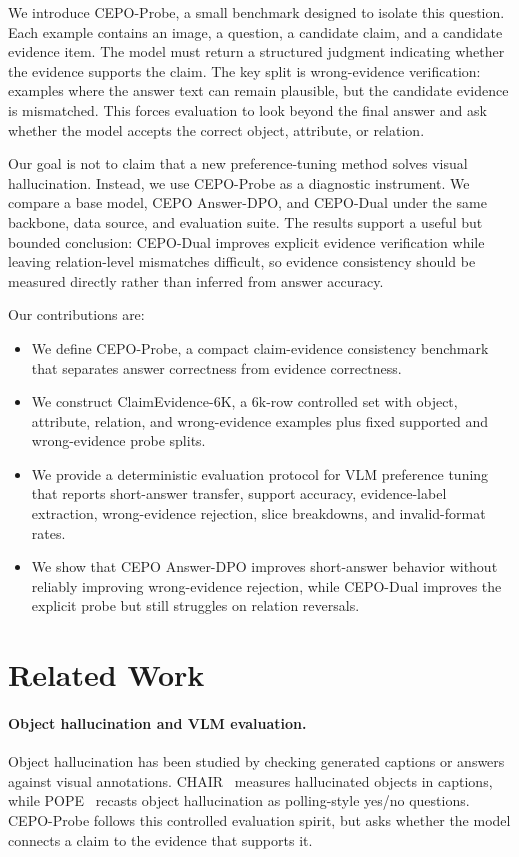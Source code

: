 \documentclass[10pt,twocolumn,letterpaper]{article}
\newcommand{\benchmark}{CEPO-Probe}
\newcommand{\dataset}{ClaimEvidence-6K}
\newcommand{\answerdpo}{CEPO Answer-DPO}
\newcommand{\cepodual}{CEPO-Dual}
\begin{document}
We introduce \benchmark{}, a small benchmark designed to isolate this question.
Each example contains an image, a question, a candidate claim, and a candidate
evidence item. The model must return a structured judgment indicating whether
the evidence supports the claim. The key split is wrong-evidence verification:
examples where the answer text can remain plausible, but the candidate
evidence is mismatched. This forces evaluation to look beyond the final answer
and ask whether the model accepts the correct object, attribute, or relation.

Our goal is not to claim that a new preference-tuning method solves visual
hallucination. Instead, we use \benchmark{} as a diagnostic instrument. We
compare a base model, \answerdpo{}, and \cepodual{} under the same backbone,
data source, and evaluation suite. The results support a useful but bounded
conclusion: \cepodual{} improves explicit evidence verification while leaving
relation-level mismatches difficult, so evidence consistency should be measured
directly rather than inferred from answer accuracy.

Our contributions are:
\begin{itemize}
    \item We define \benchmark{}, a compact claim-evidence consistency
    benchmark that separates answer correctness from evidence correctness.
    \item We construct \dataset{}, a 6k-row controlled set with object,
    attribute, relation, and wrong-evidence examples plus fixed supported and
    wrong-evidence probe splits.
    \item We provide a deterministic evaluation protocol for VLM preference
    tuning that reports short-answer transfer, support accuracy,
    evidence-label extraction, wrong-evidence rejection, slice breakdowns, and
    invalid-format rates.
    \item We show that \answerdpo{} improves short-answer behavior without
    reliably improving wrong-evidence rejection, while \cepodual{} improves the
    explicit probe but still struggles on relation reversals.
\end{itemize}

\section{Related Work}

\paragraph{Object hallucination and VLM evaluation.}
Object hallucination has been studied by checking generated captions or
answers against visual annotations. CHAIR~\cite{chair} measures hallucinated
objects in captions, while POPE~\cite{pope} recasts object hallucination as
polling-style yes/no questions. \benchmark{} follows this controlled
evaluation spirit, but asks whether the model connects a claim to the evidence
that supports it.
\end{document}
